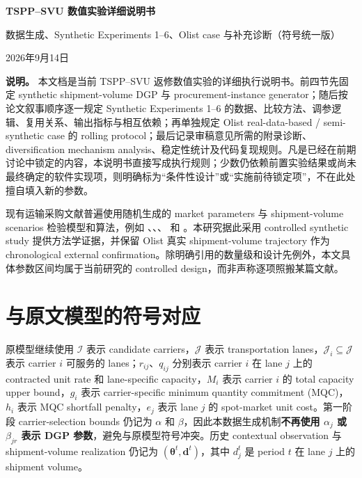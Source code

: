 \documentclass[11pt,a4paper]{ctexart}
\newcommand{\I}{\mathcal I}
\newcommand{\J}{\mathcal J}
\begin{document}
\pagestyle{plain}

\begin{center}
{\LARGE\bfseries TSPP--SVU 数值实验详细说明书}\par
\vspace{0.45em}
{\large 数据生成、Synthetic Experiments 1--6、Olist case 与补充诊断（符号统一版）}\par
\vspace{0.65em}
{\small 2026年9月14日}\par
\end{center}

\vspace{0.5em}
\noindent\textbf{说明。} 本文档是当前 TSPP--SVU 返修数值实验的详细执行说明书。前四节先固定 synthetic shipment-volume DGP 与 procurement-instance generator；随后按论文叙事顺序逐一规定 Synthetic Experiments 1--6 的数据、比较方法、调参逻辑、复用关系、输出指标与相互依赖；再单独规定 Olist real-data-based / semi-synthetic case 的 rolling protocol；最后记录审稿意见所需的附录诊断、diversification mechanism analysis、稳定性统计及代码复现规则。凡是已经在前期讨论中锁定的内容，本说明书直接写成执行规则；少数仍依赖前置实验结果或尚未最终确定的软件实现项，则明确标为“条件性设计”或“实施前待锁定项”，不在此处擅自填入新的参数。

现有运输采购文献普遍使用随机生成的 market parameters 与 shipment-volume scenarios 检验模型和算法，例如 \citet{ma2010}、\citet{remli2013}、\citet{zhang2015}、\citet{remli2019} 和 \citet{li2023}。本研究据此采用 controlled synthetic study 提供方法学证据，并保留 Olist 真实 shipment-volume trajectory 作为 chronological external confirmation。除明确引用的数量级和设计先例外，本文具体参数区间均属于当前研究的 controlled design，而非声称逐项照搬某篇文献。

\tableofcontents
\clearpage

\section{与原文模型的符号对应}

原模型继续使用 $\I$ 表示 candidate carriers，$\J$ 表示 transportation lanes，$\J_i\subseteq\J$ 表示 carrier $i$ 可服务的 lanes；$r_{ij}$、$q_{ij}$ 分别表示 carrier $i$ 在 lane $j$ 上的 contracted unit rate 和 lane-specific capacity，$M_i$ 表示 carrier $i$ 的 total capacity upper bound，$g_i$ 表示 carrier-specific minimum quantity commitment (MQC)，$h_i$ 表示 MQC shortfall penalty，$e_j$ 表示 lane $j$ 的 spot-market unit cost。第一阶段 carrier-selection bounds 仍记为 $\alpha$ 和 $\beta$，因此本数据生成机制\textbf{不再使用 $\alpha_j$ 或 $\beta_{jr}$ 表示 DGP 参数}，避免与原模型符号冲突。历史 contextual observation 与 shipment-volume realization 仍记为 $(\boldsymbol\theta^t,\boldsymbol d^t)$，其中 $d_j^t$ 是 period $t$ 在 lane $j$ 上的 shipment volume。
\end{document}
